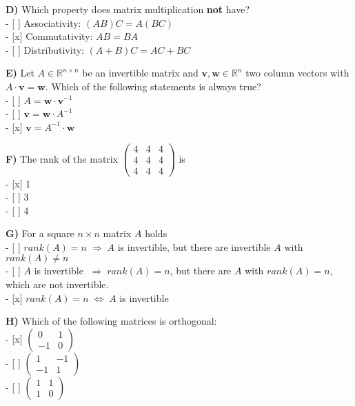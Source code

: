\documentclass[11pt]{article}
\begin{document}
    \textbf{D)} Which property does matrix multiplication \textbf{not}
have?\\
- {[} {]} Associativity: \((AB)C = A(BC)\)\\
- {[}x{]} Commutativity: \(AB = BA\)\\
- {[} {]} Distributivity: \((A+B)C = AC + BC\)

    \textbf{E)} Let \(A \in \mathbb{R}^{n \times n}\) be an invertible
matrix and \(\mathbf{v},\mathbf{w} \in \mathbb{R}^n\) two column vectors
with \(A \cdot \mathbf{v} = \mathbf{w}\). Which of the following
statements is always true?\\
- {[} {]} \(A = \mathbf{w} \cdot \mathbf{v}^{-1}\)\\
- {[} {]} \(\mathbf{v} = \mathbf{w} \cdot A^{-1}\)\\
- {[}x{]} \(\mathbf{v} = A^{-1} \cdot \mathbf{w}\)

    \textbf{F)} The rank of the matrix
\(\left( \begin{array}{rrr} 4 & 4 & 4 \\ 4 & 4 & 4 \\ 4 & 4 & 4 \end{array} \right)\)
is\\
- {[}x{]} 1\\
- {[} {]} 3\\
- {[} {]} 4

    \textbf{G)} For a square \(n \times n\) matrix \(A\) holds\\
- {[} {]} \(rank(A) = n \; \Rightarrow \; A\) is invertible, but there
are invertible \(A\) with \(rank(A) \neq n\)\\
- {[} {]} \(A\) is invertible \(\; \Rightarrow \; rank(A) = n\), but
there are \(A\) with \(rank(A) = n\), which are not invertible.\\
- {[}x{]} \(rank(A) = n \; \iff \; A\) is invertible

    \textbf{H)} Which of the following matrices is orthogonal:\\
- {[}x{]}
\(\left( \begin{array}{rr} 0 & 1 \\ -1 & 0 \end{array} \right)\)\\
- {[} {]}
\(\left( \begin{array}{rr} 1 & -1 \\ -1 & 1 \end{array} \right)\)\\
- {[} {]}
\(\left( \begin{array}{rr} 1 & 1 \\ 1 & 0 \end{array} \right)\)
\end{document}
